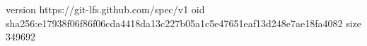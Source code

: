 version https://git-lfs.github.com/spec/v1
oid sha256:e17938f06f86f06cda4418da13c227b05a1c5e47651eaf13d248e7ae18fa4082
size 349692
